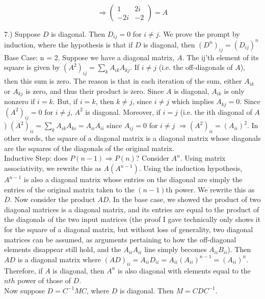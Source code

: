 \documentclass[12pt]{article}
\begin{document}
$$\Rightarrow \begin{pmatrix} 1 & 2i \\ -2i & -2 \end{pmatrix} = A$$

7.) Suppose $D$ is diagonal. Then $D_{ij} = 0$ for $i \neq j$. We prove the prompt by induction, where the hypothesis is that if $D$ is diagonal, then $(D^n)_{ij} = (D_{ij})^n$ \\

Base Case: n = 2. Suppose we have a diagonal matrix, $A$. The ij'th element of its square is given by $(A^2)_{ij} = \sum_{k}A_{ik}A_{kj}$. If $i \neq j$ (i.e. the off-diagonals of $A$), then this sum is zero. The reason is that in each iteration of the sum, either $A_{ik}$ or $A_{kj}$ is zero, and thus their product is zero. Since $A$ is diagonal, $A_{ik}$ is only nonzero if $i = k$. But, if $i = k$, then $k \neq j$, since $i \neq j$ which implies $A_{kj} = 0$. Since $(A^2)_{ij} = 0$ for $i \neq j$, $A^2$ is diagonal. Moreover, if $i = j$ (i.e. the ith diagonal of $A$) $(A^2)_{ii} = \sum_kA_{ik}A_{ki} = A_{ii}A_{ii}$ since $A_{ij} = 0$ for $i \neq j$ $\Rightarrow (A^2)_{ii} = (A_{ii})^2$. In other words, the square of a diagonal matrix is a diagonal matrix whose diagonals are the squares of the diagonals of the original matrix.\\

Inductive Step: does $P(n-1) \Rightarrow P(n)$? Consider $A^{n}$. Using matrix associativity, we rewrite this as $A(A^{n - 1})$. Using the induction hypothesis, $A^{n - 1}$ is also a diagonal matrix whose entries on the diagonal are simply the entries of the original matrix taken to the $(n-1)$th power. We rewrite this as $D$. Now consider the product $AD$. In the base case, we showed the product of two diagonal matrices is a diagonal matrix, and its entries are equal to the product of the diagonals of the two input matrices (the proof I gave technically only shows it for the square of a diagonal matrix, but without loss of generality, two diagonal matrices can be assumed, as arguments pertaining to how the off-diagonal elements disappear still hold, and the $A_{ii}A_{ii}$ line simply becomes $A_{ii}B_{ii}$). Then $AD$ is a diagonal matrix where $(AD)_{ii} = A_{ii}D_{ii} = A_{ii}(A_{ii})^{n - 1} = (A_{ii})^n$. Therefore, if $A$ is diagonal, then $A^n$ is also diagonal with elements equal to the $nth$ power of those of $D$.\\

Now suppose $D = C^{-1}MC$, where $D$ is diagonal. Then $M = CDC^{-1}$. 
\end{document}
